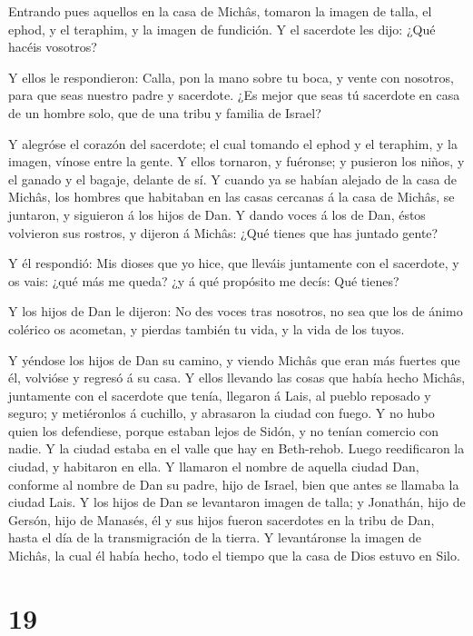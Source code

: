  Entrando pues aquellos en la casa de Michâs, tomaron la
imagen de talla, el ephod, y el teraphim, y la imagen de fundición. Y el
sacerdote les dijo: ¿Qué hacéis vosotros?

 Y ellos le respondieron: Calla, pon la mano sobre tu boca,
y vente con nosotros, para que seas nuestro padre y sacerdote. ¿Es mejor
que seas tú sacerdote en casa de un hombre solo, que de una tribu y
familia de Israel?

 Y alegróse el corazón del sacerdote; el cual tomando el
ephod y el teraphim, y la imagen, vínose entre la gente.  Y
ellos tornaron, y fuéronse; y pusieron los niños, y el ganado y el
bagaje, delante de sí.  Y cuando ya se habían alejado de la
casa de Michâs, los hombres que habitaban en las casas cercanas á la
casa de Michâs, se juntaron, y siguieron á los hijos de Dan.
 Y dando voces á los de Dan, éstos volvieron sus rostros, y
dijeron á Michâs: ¿Qué tienes que has juntado gente?

 Y él respondió: Mis dioses que yo hice, que lleváis
juntamente con el sacerdote, y os vais: ¿qué más me queda? ¿y á qué
propósito me decís: Qué tienes?

 Y los hijos de Dan le dijeron: No des voces tras nosotros,
no sea que los de ánimo colérico os acometan, y pierdas también tu vida,
y la vida de los tuyos.

 Y yéndose los hijos de Dan su camino, y viendo Michâs que
eran más fuertes que él, volvióse y regresó á su casa.  Y
ellos llevando las cosas que había hecho Michâs, juntamente con el
sacerdote que tenía, llegaron á Lais, al pueblo reposado y seguro; y
metiéronlos á cuchillo, y abrasaron la ciudad con fuego.  Y
no hubo quien los defendiese, porque estaban lejos de Sidón, y no tenían
comercio con nadie. Y la ciudad estaba en el valle que hay en
Beth-rehob. Luego reedificaron la ciudad, y habitaron en ella.
 Y llamaron el nombre de aquella ciudad Dan, conforme al
nombre de Dan su padre, hijo de Israel, bien que antes se llamaba la
ciudad Lais.  Y los hijos de Dan se levantaron imagen de
talla; y Jonathán, hijo de Gersón, hijo de Manasés, él y sus hijos
fueron sacerdotes en la tribu de Dan, hasta el día de la transmigración
de la tierra.  Y levantáronse la imagen de Michâs, la cual
él había hecho, todo el tiempo que la casa de Dios estuvo en Silo.

\hypertarget{section-18}{%
\section{19}\label{section-18}}

